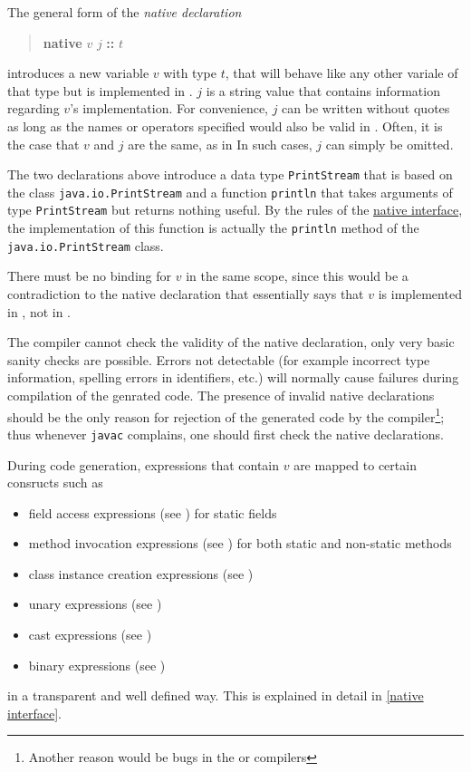 The general form of the \emph{native declaration}
\begin{quote}
\textbf{native} $v$  $j$ \textbf{::} $t$
\end{quote}
introduces a new variable $v$ with type $t$, that will behave like any other \frege{} variale of that type but is implemented in \java{}. $j$ is a string value that contains information regarding $v$'s \java{} implementation. For convenience, $j$ can be written without quotes as long as the names or operators specified would also be valid in \frege{}. Often, it is the case that $v$ and $j$ are the same, as in 
In such cases, $j$ can simply be omitted.

The two declarations above introduce a data type \texttt{PrintStream} that is based on the \java{} class \texttt{java.io.PrintStream} and a function \texttt{println} that takes arguments of type \texttt{PrintStream} but returns nothing useful. By the rules of the \hyperref[native interface]{native interface}, the implementation of this function is actually the \texttt{println} method of the \texttt{java.io.PrintStream} class.

There must be no binding for $v$ in the same scope, since this would be a contradiction to the native declaration that essentially says that $v$ is implemented in \java{}, not in \frege{}.

The compiler cannot check the validity of the native declaration, only very basic sanity checks are possible. Errors not detectable (for example incorrect type information, spelling errors in identifiers, etc.) will normally cause failures during compilation of the genrated \java{} code. The presence of invalid native declarations should be the only reason for rejection of the generated code by the \java{} compiler\footnote{Another reason would be bugs in the \java{} or \frege{} compilers}; thus whenever \texttt{javac} complains, one should first check the native declarations.

During code generation, expressions that contain $v$ are mapped to certain \java{} consructs such as

\begin{itemize}
\item field access expressions (see \cite[section 15.11]{langspec3}) for static fields
\item method invocation expressions (see \cite[section 15.12]{langspec3}) for both static and non-static methods
\item class instance creation expressions (see \cite[section 15.9]{langspec3})
\item unary expressions (see \cite[section 15.15]{langspec3})
\item cast expressions (see \cite[section 15.16]{langspec3})
\item binary expressions (see \cite[section 15.17 to 15.24]{langspec3})
\end{itemize}

in a transparent and well defined way. This is explained in detail in \autoref{native interface}.
